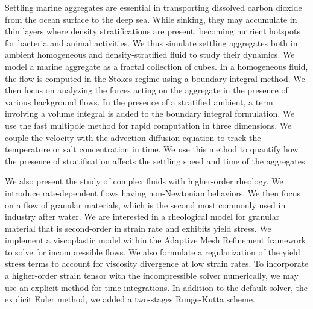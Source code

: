 
\par
Settling marine aggregates are essential in transporting dissolved carbon dioxide from the ocean surface to the deep sea. While sinking, they may accumulate in thin layers where density stratifications are present, becoming nutrient hotspots for bacteria and animal activities. We thus simulate settling aggregates both in ambient homogeneous and density-stratified fluid to study their dynamics. 
We model a marine aggregate as a fractal collection of cubes. 
In a homogeneous fluid, 
the flow is computed in the Stokes regime using a boundary integral method.
We then focus on analyzing the forces acting on the aggregate in the presence of various background flows. 
In the presence of a stratified ambient, a term involving a volume integral is added to the boundary integral formulation. We use the fast multipole method 
for rapid computation in three dimensions. We couple the velocity with the advection-diffusion equation to track the temperature or salt concentration in time. We use this method to quantify how the presence of stratification affects the settling speed and time of the aggregates.
\par
We also present the study of complex fluids with higher-order rheology. We introduce rate-dependent flows having non-Newtonian behaviors. 
We then focus on a flow of granular materials, which is the second most commonly used in industry after water.
We are interested in a rheological model for granular material that is second-order in strain rate and exhibits yield stress.
We implement a viscoplastic model within the Adaptive Mesh Refinement framework to solve for incompressible flows.
We also formulate a regularization of the yield stress terms to account for viscosity divergence at low strain rates. 
To incorporate a higher-order strain tensor with the incompressible solver numerically, we may use an explicit method for time integrations. In addition to the default solver, the explicit Euler method, we added a two-stages Runge-Kutta scheme.